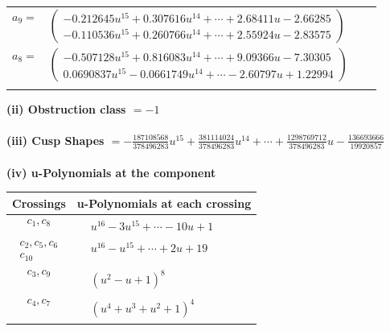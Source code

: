\documentclass[1p]{elsarticle_modified}
\theoremstyle{definition}
\begin{document}
\begin{tabular}{m{7pt} m{180pt} m{7pt} m{180pt} }
\flushright $a_{9}=$&$\begin{pmatrix}-0.212645 u^{15}+0.307616 u^{14}+\cdots+2.68411 u-2.66285\\-0.110536 u^{15}+0.260766 u^{14}+\cdots+2.55924 u-2.83575\end{pmatrix}$ \\
\flushright $a_{8}=$&$\begin{pmatrix}-0.507128 u^{15}+0.816083 u^{14}+\cdots+9.09366 u-7.30305\\0.0690837 u^{15}-0.0661749 u^{14}+\cdots-2.60797 u+1.22994\end{pmatrix}$\\&\end{tabular}
\flushleft \textbf{(ii) Obstruction class $= -1$}\\~\\
\flushleft \textbf{(iii) Cusp Shapes $= -\frac{187108568}{378496283} u^{15}+\frac{381114024}{378496283} u^{14}+\cdots+\frac{1298769712}{378496283} u-\frac{136693666}{19920857}$}\\~\\
\newpage\renewcommand{\arraystretch}{1}
\flushleft \textbf{(iv) u-Polynomials at the component}\newline \\
\begin{tabular}{m{50pt}|m{274pt}}
Crossings & \hspace{64pt}u-Polynomials at each crossing \\
\hline $$\begin{aligned}c_{1},c_{8}\end{aligned}$$&$\begin{aligned}
&u^{16}-3 u^{15}+\cdots-10 u+1
\end{aligned}$\\
\hline $$\begin{aligned}c_{2},c_{5},c_{6}\\c_{10}\end{aligned}$$&$\begin{aligned}
&u^{16}- u^{15}+\cdots+2 u+19
\end{aligned}$\\
\hline $$\begin{aligned}c_{3},c_{9}\end{aligned}$$&$\begin{aligned}
&(u^2- u+1)^8
\end{aligned}$\\
\hline $$\begin{aligned}c_{4},c_{7}\end{aligned}$$&$\begin{aligned}
&(u^4+u^3+u^2+1)^4
\end{aligned}$\\
\hline
\end{tabular}\\~\\
\end{document}
